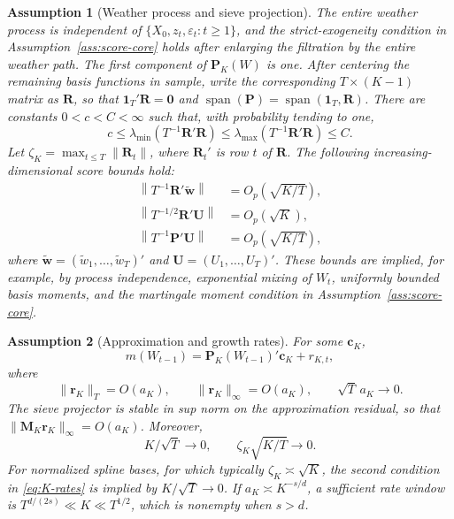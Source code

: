 \documentclass{article}
\newtheorem{assumption}{Assumption}
\begin{document}
\begin{assumption}[Weather process and sieve projection]
\label{ass:sieve-projection}
The entire weather process is independent of
\(\{X_0,z_t,\varepsilon_t:t\geq1\}\), and the strict-exogeneity condition in
Assumption~\ref{ass:score-core} holds after enlarging the filtration by the
entire weather path.  The first component of \(\bm P_K(W)\) is one.  After
centering the remaining basis functions in sample, write the corresponding
\(T\times(K-1)\) matrix as \(\bm R\), so that
\(\bm 1_T'\bm R=\bm0\) and
\(\operatorname{span}(\bm P)=\operatorname{span}(\bm1_T,\bm R)\).
There are constants \(0<c<C<\infty\) such that, with probability tending to
one,
\[
    c\leq\lambda_{\min}(T^{-1}\bm R'\bm R)
      \leq\lambda_{\max}(T^{-1}\bm R'\bm R)\leq C.
\]
Let \(\zeta_K=\max_{t\leq T}\|\bm R_t\|\), where \(\bm R_t'\) is row \(t\)
of \(\bm R\).  The following increasing-dimensional score bounds hold:
\begin{align}
    \left\|T^{-1}\bm R'\widetilde{\bm w}\right\|
        &=O_p\!\left(\sqrt{K/T}\right),                                  \label{eq:rate-Rw}\\
    \left\|T^{-1/2}\bm R'\bm U\right\|&=O_p(\sqrt K),                    \label{eq:rate-RU}\\
    \left\|T^{-1}\bm P'\bm U\right\|
        &=O_p\!\left(\sqrt{K/T}\right),                                  \label{eq:rate-PU}
\end{align}
where \(\widetilde{\bm w}=(\widetilde w_1,\ldots,\widetilde w_T)'\) and
\(\bm U=(U_1,\ldots,U_T)'\).  These bounds are implied, for example, by
process independence, exponential mixing of \(W_t\), uniformly bounded basis
moments, and the martingale moment condition in
Assumption~\ref{ass:score-core}.
\end{assumption}

\begin{assumption}[Approximation and growth rates]
\label{ass:approximation}
For some \(\bm c_K\),
\[
    m(W_{t-1})=\bm P_K(W_{t-1})'\bm c_K+r_{K,t},
\]
where
\[
    \|\bm r_K\|_T=O(a_K),\qquad
    \|\bm r_K\|_\infty=O(a_K),\qquad
    \sqrt T\,a_K\longrightarrow0.
\]
The sieve projector is stable in sup norm on the approximation residual, so
that \(\|\bm M_K\bm r_K\|_\infty=O(a_K)\).  Moreover,
\begin{equation}
    K/\sqrt T\longrightarrow0,
    \qquad
    \zeta_K\sqrt{K/T}\longrightarrow0.
    \label{eq:K-rates}
\end{equation}
For normalized spline bases, for which typically \(\zeta_K\asymp\sqrt K\),
the second condition in \eqref{eq:K-rates} is implied by
\(K/\sqrt T\to0\).  If \(a_K\asymp K^{-s/d}\), a sufficient rate window is
\(T^{d/(2s)}\ll K\ll T^{1/2}\), which is nonempty when \(s>d\).
\end{assumption}
\end{document}
